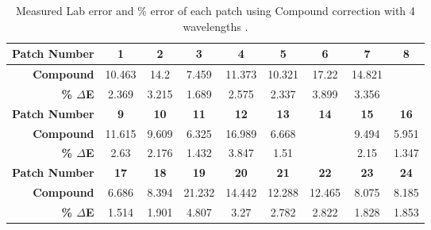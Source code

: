 \begin{table}[H]
  \caption{Measured Lab error and \% error of each patch using Compound correction with 4 wavelengths .}\n  \begin{center}
    \begin{tabularx}{\textwidth}{r c c c c c c c c}
    \toprule
        \textbf{Patch Number} & \textbf{1} & \textbf{2} & \textbf{3} & \textbf{4} & \textbf{5} & \textbf{6} & \textbf{7} & \textbf{8}\\ \midrule 
        \textbf{Compound} &10.463 &14.2 &7.459 &11.373 &10.321 &17.22 &14.821 &\cellcolor{colorred}{21.988}\\ 
        \textbf{\textbf{\% $\Delta$E}} &2.369 &3.215 &1.689 &2.575 &2.337 &3.899 &3.356 &\cellcolor{colorred}{4.978}\\ \midrule 
        \textbf{Patch Number} & \textbf{9} & \textbf{10} & \textbf{11} & \textbf{12} & \textbf{13} & \textbf{14} & \textbf{15} & \textbf{16}\\ \midrule 
        \textbf{Compound} &11.615 &9.609 &6.325 &16.989 &6.668 &\cellcolor{colorgreen}{5.001} &9.494 &5.951\\ 
        \textbf{\textbf{\% $\Delta$E}} &2.63 &2.176 &1.432 &3.847 &1.51 &\cellcolor{colorgreen}{1.132} &2.15 &1.347\\ \midrule 
        \textbf{Patch Number} & \textbf{17} & \textbf{18} & \textbf{19} & \textbf{20} & \textbf{21} & \textbf{22} & \textbf{23} & \textbf{24}\\ \midrule 
        \textbf{Compound} &6.686 &8.394 &21.232 &14.442 &12.288 &12.465 &8.075 &8.185\\ 
        \textbf{\textbf{\% $\Delta$E}} &1.514 &1.901 &4.807 &3.27 &2.782 &2.822 &1.828 &1.853\\ \midrule 
    \bottomrule
    \end{tabularx}
  \end{center}
\end{table}
